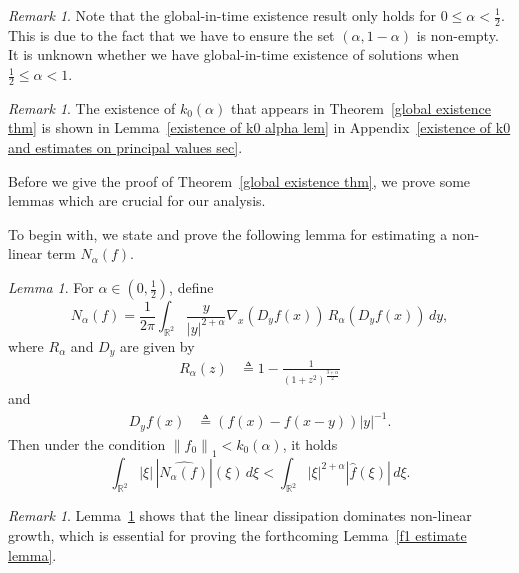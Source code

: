 \documentclass[reqno]{amsart}%
\theoremstyle{definition}
\theoremstyle{remark}
\newtheorem{rem}[thm]{Remark}
\numberwithin{equation}{section}
\newtheorem{lemma}[theorem]{Lemma}
\newcommand{\0}{\mathbf{0}}
\newcommand{\1}{\mathbf{1}}
\numberwithin{equation}{section}
\numberwithin{theorem}{section}
\numberwithin{figure}{section}
\begin{document}
\begin{rem}
Note that the global-in-time existence result only holds for  $0 \le \alpha < \frac{1}{2}$. This is due to the fact that we have to ensure the set $(\alpha, 1 - \alpha )$ is non-empty. It is unknown whether we have global-in-time existence of solutions when $ \frac{1}{2} \le \alpha < 1 $.
\end{rem}

\begin{rem}
The existence of $k_0(\alpha)$ that appears in Theorem~\ref{global existence thm} is shown in Lemma~\ref{existence of k0 alpha lem} in Appendix~\ref{existence of k0 and estimates on principal values sec}.
\end{rem}

Before we give the proof of Theorem~\ref{global existence thm}, we prove some lemmas which are crucial for our analysis. {To begin with, we state and prove the following lemma for estimating a non-linear term $N_\alpha (f)$.

\begin{lemma}\label{estimate on non-linear N lem}
For $\alpha\in(0,\frac{1}{2})$, define
\begin{equation}\label{def of non-linear term N}
N_\alpha (f) = \frac{1}{2\pi} \int_{\mathbb{R}^2} \frac{y}{|y|^{2 + \alpha}} \nabla_x (D_y f(x)) \, R_\alpha (D_y f(x)) \, dy,
\end{equation}
where $R_\alpha$ and $D_y$ are given by
\begin{align*}
R_\alpha(z) &\triangleq 1 - \frac{1}{(1 + z^2)^{\frac{3 + \alpha}{2}}}
\end{align*}
and
\begin{align*}
D_y f (x)&\triangleq \left( f(x) - f(x - y)\right) |y|^{-1}.
\end{align*}
Then under the condition $\left\| f_{0} \right\|_{1} < k_{0}(\alpha)$, it holds 
\begin{equation}\label{estimate on N(f) term}
\int_{\mathbb{R}^{2}} |\xi| \, |\widehat{N_{\alpha}(f)}|(\xi) \, d\xi < \int_{\mathbb{R}^{2}} |\xi|^{2+\alpha} |\hat{f}(\xi)| \, d\xi.
\end{equation}
\end{lemma}

\begin{rem}
Lemma~\ref{estimate on non-linear N lem} shows that the linear dissipation dominates non-linear growth, which is essential for proving the forthcoming Lemma~\ref{f1 estimate lemma}.
\end{rem}

}
\end{document}
